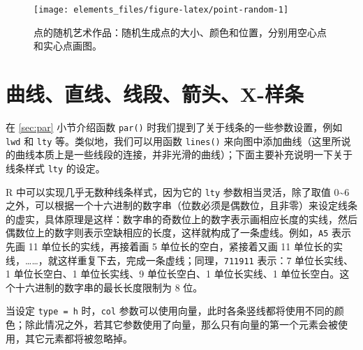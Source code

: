 \documentclass[
  b5paper,
  UTF8,twoside]{book}
\begin{document}
\begin{figure}

{\centering \texttt{[image: elements\_files/figure-latex/point-random-1]} 

}

\caption[点的随机艺术作品]{点的随机艺术作品：随机生成点的大小、颜色和位置，分别用空心点和实心点画图。}\label{fig:point-random}
\end{figure}





\section{曲线、直线、线段、箭头、X-样条}\label{sec:lines}

在 \ref{sec:par} 小节介绍函数 \texttt{par()} 时我们提到了关于线条的一些参数设置，例如 \texttt{lwd} 和 \texttt{lty} 等。类似地，我们可以用函数 \texttt{lines()} 来向图中添加曲线（这里所说的曲线本质上是一些线段的连接，并非光滑的曲线）；下面主要补充说明一下关于线条样式 \texttt{lty} 的设定。

R 中可以实现几乎无数种线条样式，因为它的 \texttt{lty} 参数相当灵活，除了取值 0\textasciitilde6 之外，可以根据一个十六进制的数字串（位数必须是偶数位，且非零）来设定线条的虚实，具体原理是这样：数字串的奇数位上的数字表示画相应长度的实线，然后偶数位上的数字则表示空缺相应的长度，这样就构成了一条虚线。例如，\texttt{\textquotesingle{}A5\textquotesingle{}} 表示先画 11 单位长的实线，再接着画 5 单位长的空白，紧接着又画 11 单位长的实线，\ldots\ldots，就这样重复下去，完成一条虚线；同理，\texttt{\textquotesingle{}711911\textquotesingle{}} 表示：7 单位长实线、1 单位长空白、1 单位长实线、9 单位长空白、1 单位长实线、1 单位长空白。这个十六进制的数字串的最长长度限制为 8 位。

当设定 \texttt{type\ =\ \textquotesingle{}h\textquotesingle{}} 时，\texttt{col} 参数可以使用向量，此时各条竖线都将使用不同的颜色；除此情况之外，若其它参数使用了向量，那么只有向量的第一个元素会被使用，其它元素都将被忽略掉。
\end{document}
